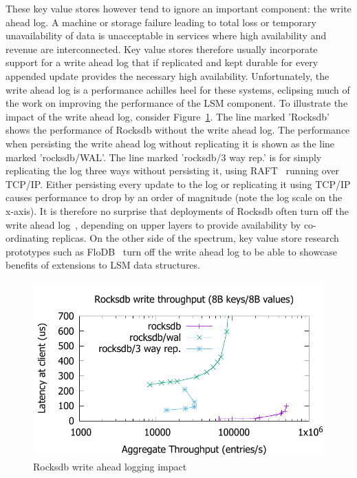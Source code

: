 \documentclass[letterpaper,twocolumn,10pt]{article}
\begin{document}
These key value stores however tend to ignore an important component: the write
ahead log. A machine or storage failure leading to total loss or temporary
unavailability of data is unacceptable in services where high availability and
revenue are interconnected. Key value stores therefore usually incorporate
support for a write ahead log that if replicated and kept durable for every
appended update provides the necessary high availability. Unfortunately, the
write ahead log is a performance achilles heel for these systems, eclipsing much
of the work on improving the performance of the LSM component. To illustrate the
impact of the write ahead log, consider Figure~\ref{fig:problem}. The line
marked 'Rocksdb' shows the performance of Rocksdb without the write ahead
log. The performance when persisting the write ahead log without replicating it
is shown as the line marked 'rocksdb/WAL'. The line marked 'rocksdb/3 way rep.'
is for simply replicating the log three ways without persisting it, using
RAFT~\cite{raft} running over TCP/IP. Either persisting every update to the log
or replicating it using TCP/IP causes performance to drop by an order of
magnitude (note the log scale on the x-axis). It is therefore no surprise that
deployments of Rocksdb often turn off the write ahead log~\cite{samza},
depending on upper layers to provide availability by co-ordinating replicas. On
the other side of the spectrum, key value store research prototypes such as
FloDB~\cite{flodb} turn off the write ahead log to be able to showcase benefits
of extensions to LSM data structures.


\begin{figure}
\centering \includegraphics[scale=0.5]{results2/problem.pdf}
\caption{Rocksdb write ahead logging impact}
\label{fig:problem}
\end{figure}
\end{document}
